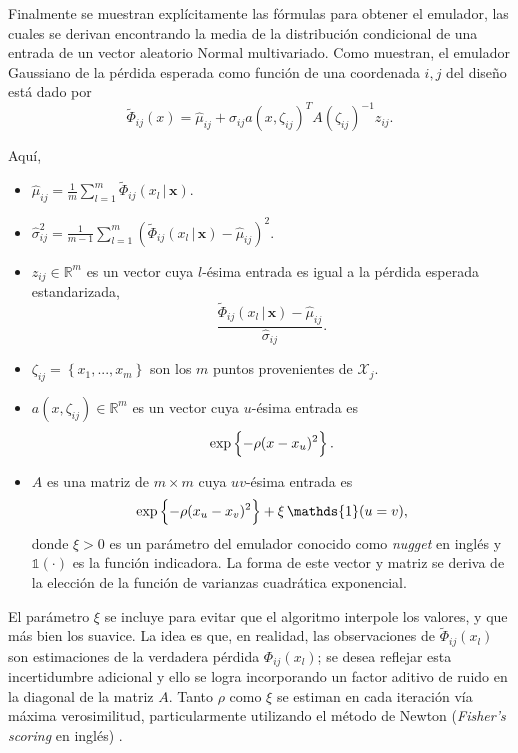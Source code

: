 Finalmente se muestran explícitamente las fórmulas para obtener el emulador, las cuales se derivan encontrando la media de la distribución condicional de una entrada de un vector aleatorio Normal multivariado. Como \citep{Woods_ACE, Woods_etal} muestran, el emulador Gaussiano de la pérdida esperada como función de una coordenada $i,j$ del diseño está dado por
\begin{equation} \label{eq:GPemulator}
	\tilde{\Phi}_{ij}(x) = \hat{\mu}_{ij} + \hat{\sigma}_{ij} a(x, \zeta_{ij})^T A \left( \zeta_{ij} \right)^{-1} z_{ij}.
\end{equation}

\newpage

Aquí,
\begin{itemize}
\item $\hat{\mu}_{ij} = \frac{1}{m} \sum_{l=1}^{m} \tilde{\Phi}_{ij} ( x_l \, | \, \mathbf{x} )$.
\item $\hat{\sigma}_{ij}^2 = \frac{1}{m-1} \sum_{l=1}^{m} \left( \tilde{\Phi}_{ij} ( x_l \, | \, \mathbf{x} ) - \hat{\mu}_{ij} \right)^2$.
\item $z_{ij} \in \mathbb{R}^m$ es un vector cuya $l$-ésima entrada es igual a la pérdida esperada estandarizada,
\begin{equation*}
	\frac{ \tilde{\Phi}_{ij} ( x_l \, | \, \mathbf{x} ) - \hat{\mu}_{ij} }{ \hat{\sigma}_{ij} }.
\end{equation*}
\item $\zeta_{ij} = \left\{ x_1, ..., x_m  \right\}$ son los $m$ puntos provenientes de $\mathcal{X}_j$. 
\item $a(x, \zeta_{ij}) \in \mathbb{R}^m$ es un vector cuya $u$-ésima entrada es
\begin{equation*}
	\mathrm{exp} \left\{ -\rho (x - x_u)^2 \right\}.
\end{equation*}
\item $A$ es una matriz de $m \times m$ cuya $uv$-ésima entrada es
\begin{equation*}
	\Exp \left\{ -\rho (x_u - x_v)^2 \right\} + \xi \, \mathds{1}(u=v),
\end{equation*}
donde $\xi > 0$ es un parámetro del emulador conocido como \textit{nugget} en inglés y $\mathds{1}(\cdot)$ es la función indicadora. La forma de este vector y matriz se deriva de la elección de la función de varianzas cuadrática exponencial.
\end{itemize}

El parámetro $\xi$ se incluye para evitar que el algoritmo interpole los valores, y que más bien los suavice. La idea es que, en realidad, las observaciones de $\tilde{\Phi}_{ij}(x_l)$ son estimaciones de la verdadera pérdida $\Phi_{ij}(x_l)$; se desea reflejar esta incertidumbre adicional y ello se logra incorporando un factor aditivo de ruido en la diagonal de la matriz $A$. Tanto $\rho$ como $\xi$ se estiman en cada iteración vía máxima verosimilitud, particularmente utilizando el método de Newton (\textit{Fisher's scoring} en inglés) \citep[pág. 5]{Woods_ACE}. \\


